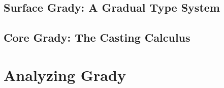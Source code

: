 \documentclass{llncs}
\begin{document}
\subsection{Surface Grady: A Gradual Type System}
\label{subsec:surface_grady:_a_gradual_type_system}


\subsection{Core Grady: The Casting Calculus}
\label{subsec:core_grady:_the_casting_calculus}


\section{Analyzing Grady}
\label{sec:results}






\appendix



\end{document}
